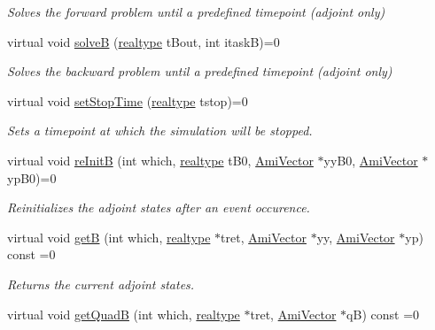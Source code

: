 \begin{DoxyCompactItemize}
\begin{DoxyCompactList}\small\item\em Solves the forward problem until a predefined timepoint (adjoint only) \end{DoxyCompactList}\item 
virtual void \mbox{\hyperlink{classamici_1_1_solver_ad1e0c0377036b859c20a67e13532e5f0}{solveB}} (\mbox{\hyperlink{namespaceamici_a1bdce28051d6a53868f7ccbf5f2c14a3}{realtype}} t\+Bout, int itaskB)=0
\begin{DoxyCompactList}\small\item\em Solves the backward problem until a predefined timepoint (adjoint only) \end{DoxyCompactList}\item 
virtual void \mbox{\hyperlink{classamici_1_1_solver_a5cc7e9730c6ab9490087203b8dd25d55}{set\+Stop\+Time}} (\mbox{\hyperlink{namespaceamici_a1bdce28051d6a53868f7ccbf5f2c14a3}{realtype}} tstop)=0
\begin{DoxyCompactList}\small\item\em Sets a timepoint at which the simulation will be stopped. \end{DoxyCompactList}\item 
virtual void \mbox{\hyperlink{classamici_1_1_solver_ac94e2d6eca13827dbf7771cc8abf144f}{re\+InitB}} (int which, \mbox{\hyperlink{namespaceamici_a1bdce28051d6a53868f7ccbf5f2c14a3}{realtype}} t\+B0, \mbox{\hyperlink{classamici_1_1_ami_vector}{Ami\+Vector}} $\ast$yy\+B0, \mbox{\hyperlink{classamici_1_1_ami_vector}{Ami\+Vector}} $\ast$yp\+B0)=0
\begin{DoxyCompactList}\small\item\em Reinitializes the adjoint states after an event occurence. \end{DoxyCompactList}\item 
virtual void \mbox{\hyperlink{classamici_1_1_solver_af0e3dc2584bfd8a8b1a1625ac9dad4f4}{getB}} (int which, \mbox{\hyperlink{namespaceamici_a1bdce28051d6a53868f7ccbf5f2c14a3}{realtype}} $\ast$tret, \mbox{\hyperlink{classamici_1_1_ami_vector}{Ami\+Vector}} $\ast$yy, \mbox{\hyperlink{classamici_1_1_ami_vector}{Ami\+Vector}} $\ast$yp) const =0
\begin{DoxyCompactList}\small\item\em Returns the current adjoint states. \end{DoxyCompactList}\item 
virtual void \mbox{\hyperlink{classamici_1_1_solver_a1a4af06dc12f51c43315cba90c4c9181}{get\+QuadB}} (int which, \mbox{\hyperlink{namespaceamici_a1bdce28051d6a53868f7ccbf5f2c14a3}{realtype}} $\ast$tret, \mbox{\hyperlink{classamici_1_1_ami_vector}{Ami\+Vector}} $\ast$qB) const =0

\end{DoxyCompactItemize}
